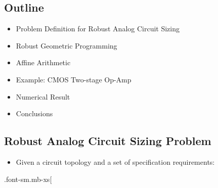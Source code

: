 \documentclass[
]{article}
\providecommand{\tightlist}{%
  \setlength{\itemsep}{0pt}\setlength{\parskip}{0pt}}
\begin{document}
\hypertarget{outline}{%
\subsection{Outline}\label{outline}}

\begin{itemize}
\tightlist
\item
  Problem Definition for Robust Analog Circuit Sizing
\item
  Robust Geometric Programming
\item
  Affine Arithmetic
\item
  Example: CMOS Two-stage Op-Amp
\item
  Numerical Result
\item
  Conclusions
\end{itemize}

\hypertarget{robust-analog-circuit-sizing-problem}{%
\subsection{Robust Analog Circuit Sizing Problem}\label{robust-analog-circuit-sizing-problem}}

\begin{itemize}
\tightlist
\item
  Given a circuit topology and a set of specification requirements:
\end{itemize}

.font-sm.mb-xs{[}
\end{document}
